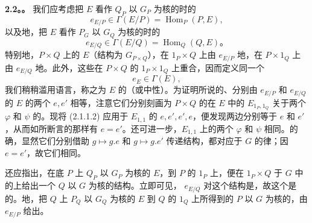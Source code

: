 \textbf{2.2。。} 我们应考虑把 $E$ 看作 $Q_P$ 以 $G_P$ 为核的时的
\[
e_{E/P}\in\Gamma(E/P)=\operatorname{Hom}_P(P,E),\tag{2.2.1}
\]
以及地，把 $E$ 看作 $P_G$ 以 $G_Q$ 为核的时的
\[
e_{E/Q}\in\Gamma(E/Q)=\operatorname{Hom}_Q(Q,E)。\tag{2.2.2}
\]
特别地，$P\times Q$ 上的 $E$（结构为 $G_{P\times Q}$），在 $1_P\times Q$ 上由 $e_{E/P}$ 地，在 $P\times1_Q$ 上由 $e_{E/Q}$ 地。此外，这些在 $P\times Q$ 的 $1_P\times1_Q$ 上重合，因而定义同一个
\[
e_E\in\Gamma(E),\tag{2.2.3}
\]
我们稍稍滥用语言，称之为 $E$ 的（或中性）。为证明所说的、分别由 $e_{E/P}$ 和 $e_{E/Q}$ 的 $E$ 的两个 $e,e'$ 相等，注意它们分别刻画为 $P\times Q$ 的在 $E$ 中的 $E_{1_P,1_Q}$ 关于两个 $\varphi$ 和 $\psi$ 的。现将 (2.1.1.2) 应用于 $E_{1,1}$ 的 $e,e',e',e$，便发现两边分别等于 $e$ 和 $e'$，从而如所断言的那样有 $e=e'$。还可进一步，$E_{1,1}$ 上的两个 $\varphi$ 和 $\psi$ 相同。的确，显然它们分别借助 $g\mapsto g.e$ 和 $g\mapsto g.e'$ 传递结构，都对应于 $G$ 的律；因 $e=e'$，故它们相同。

还应指出，在底 $P$ 上 $Q_P$ 以 $G_P$ 为核的 $E$，到 $P$ 的 $1_P$ 上，便在 $1_P\times Q$ 于 $G$ 中的上给出一个 $Q$ 以 $G$ 为核的结构。立即可见， $e_{E/Q}$ 对这个结构是，故这个是的。地，把 $Q$ 上 $P_Q$ 以 $G_Q$ 为核的 $E$ 到 $Q$ 的 $1_Q$ 上所得到的 $P$ 以 $G$ 为核的，由 $e_{E/P}$ 给出。

